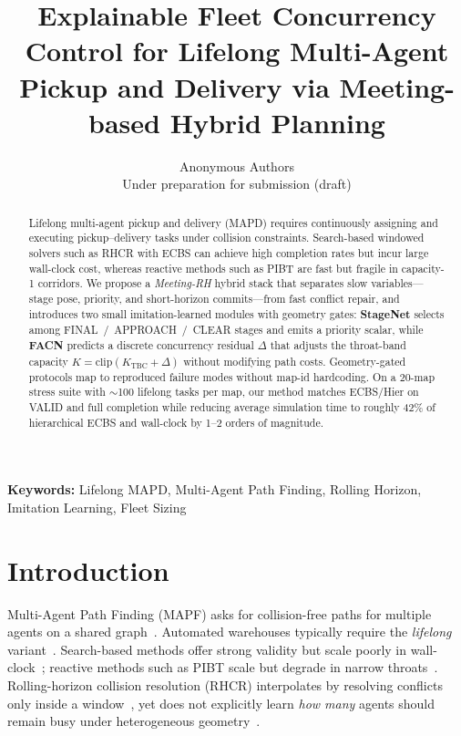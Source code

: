 \documentclass[11pt,a4paper]{article}
\title{Explainable Fleet Concurrency Control for Lifelong Multi-Agent Pickup and Delivery via Meeting-based Hybrid Planning}
\author{Anonymous Authors\\Under preparation for submission (draft)}
\date{}
\begin{document}
\maketitle

\begin{abstract}
Lifelong multi-agent pickup and delivery (MAPD) requires continuously assigning and executing pickup--delivery tasks under collision constraints. Search-based windowed solvers such as RHCR with ECBS can achieve high completion rates but incur large wall-clock cost, whereas reactive methods such as PIBT are fast but fragile in capacity-1 corridors. We propose a \emph{Meeting-RH} hybrid stack that separates slow variables---stage pose, priority, and short-horizon commits---from fast conflict repair, and introduces two small imitation-learned modules with geometry gates: \textbf{StageNet} selects among FINAL~/~APPROACH~/~CLEAR stages and emits a priority scalar, while \textbf{FACN} predicts a discrete concurrency residual $\Delta$ that adjusts the throat-band capacity $K=\mathrm{clip}(K_{\mathrm{TBC}}+\Delta)$ without modifying path costs. Geometry-gated protocols map to reproduced failure modes without map-id hardcoding. On a 20-map stress suite with $\sim$100 lifelong tasks per map, our method matches ECBS/Hier on VALID and full completion while reducing average simulation time to roughly 42\% of hierarchical ECBS and wall-clock by 1--2 orders of magnitude.
\end{abstract}

\noindent\textbf{Keywords:} Lifelong MAPD, Multi-Agent Path Finding, Rolling Horizon, Imitation Learning, Fleet Sizing

\section{Introduction}
Multi-Agent Path Finding (MAPF) asks for collision-free paths for multiple agents on a shared graph~\citep{sharon2015cbs,stern2019mapf}. Automated warehouses typically require the \emph{lifelong} variant~\citep{ma2017mapd2,li2021rhcr}. Search-based methods offer strong validity but scale poorly in wall-clock~\citep{barer2014ecbs,li2021rhcr}; reactive methods such as PIBT scale but degrade in narrow throats~\citep{okumura2022pibt}. Rolling-horizon collision resolution (RHCR) interpolates by resolving conflicts only inside a window~\citep{li2021rhcr}, yet does not explicitly learn \emph{how many} agents should remain busy under heterogeneous geometry~\citep{chen2024scaling}.
\end{document}
